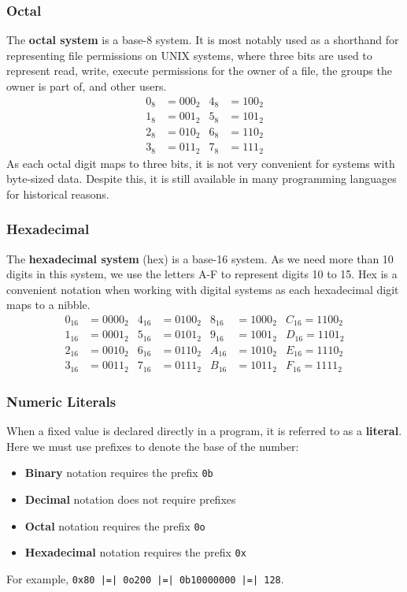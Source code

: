 \documentclass{article}
\begin{document}
\subsubsection{Octal}
The \textbf{octal system} is a base-8 system. It is most notably used
as a shorthand for representing file permissions on UNIX systems, where
three bits are used to represent read, write, execute permissions for
the owner of a file, the groups the owner is part of, and other users.
\begin{align*}
    0_8 & = 000_2 & 4_8 & = 100_2 \\
    1_8 & = 001_2 & 5_8 & = 101_2 \\
    2_8 & = 010_2 & 6_8 & = 110_2 \\
    3_8 & = 011_2 & 7_8 & = 111_2
\end{align*}
As each octal digit maps to three bits, it is not very convenient for
systems with byte-sized data. Despite this, it is still available in
many programming languages for historical reasons.
\subsubsection{Hexadecimal}
The \textbf{hexadecimal system} (hex) is a base-16 system. As we need
more than 10 digits in this system, we use the letters A-F to represent
digits 10 to 15. Hex is a convenient notation when working with digital
systems as each hexadecimal digit maps to a nibble.
\begin{align*}
    0_{16} & = 0000_2 & 4_{16} & = 0100_2 & 8_{16} & = 1000_2 & C_{16} = 1100_2 \\
    1_{16} & = 0001_2 & 5_{16} & = 0101_2 & 9_{16} & = 1001_2 & D_{16} = 1101_2 \\
    2_{16} & = 0010_2 & 6_{16} & = 0110_2 & A_{16} & = 1010_2 & E_{16} = 1110_2 \\
    3_{16} & = 0011_2 & 7_{16} & = 0111_2 & B_{16} & = 1011_2 & F_{16} = 1111_2
\end{align*}
\subsubsection{Numeric Literals}
When a fixed value is declared directly in a program, it is referred to
as a \textbf{literal}. Here we must use prefixes to denote the base of
the number:
\begin{itemize}
    \item \textbf{Binary} notation requires the prefix \texttt{0b}
    \item \textbf{Decimal} notation does not require prefixes
    \item \textbf{Octal} notation requires the prefix \texttt{0o}
    \item \textbf{Hexadecimal} notation requires the prefix \texttt{0x}
\end{itemize}
For example, \texttt{0x80 |=| 0o200 |=| 0b10000000 |=| 128}.
\end{document}
